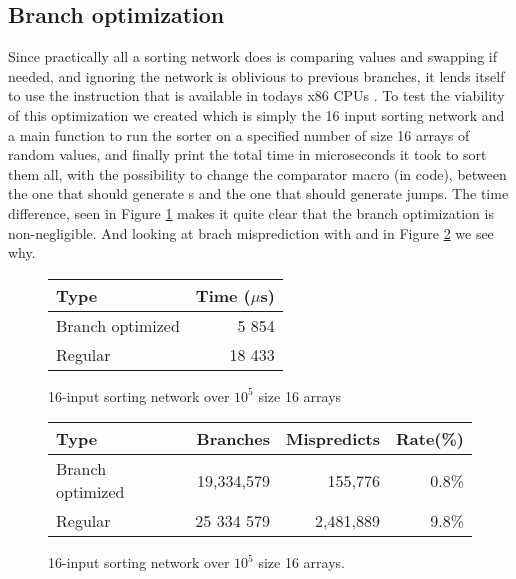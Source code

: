 \subsection{Branch optimization}
Since practically all a sorting network does is comparing values and swapping
if needed, and ignoring the network is oblivious to previous branches, it lends
itself to use the  instruction that is available in todays x86 CPUs
\cite{CCNS-2015}. To test the viability of this optimization we created
 which is simply the 16 input sorting network and a main function
to run the sorter on a specified number of size 16 arrays of random values, and
finally print the total time in microseconds it took to sort them all, with the
possibility to change the comparator macro (in code), between the one that
should generate s and the one that should generate jumps. The time
difference, seen in Figure \ref{fig:branch-time} makes it quite clear that the
branch optimization is non-negligible. And looking at brach misprediction with
 and  in Figure \ref{fig:branch-predict} we see
why.

\begin{figure}
    \centering
    \begin{tabular}{lr}
        Type             & Time ($\mu$s)\\\hline
        Branch optimized & 5 854\\
        Regular          & 18 433\\
    \end{tabular}
    \caption{16-input sorting network over $10^5$ size 16 arrays}
    \label{fig:branch-time}
\end{figure}

\begin{figure}
    \centering
    \begin{tabular}{lrrr}
        Type             & Branches & Mispredicts & Rate(\%) \\\hline
        Branch optimized & 19,334,579& 155,776    &  0.8\%\\
        Regular          & 25 334 579& 2,481,889  &  9.8\%\\
    \end{tabular}
    \caption{16-input sorting network over $10^5$ size 16 arrays.}
    \label{fig:branch-predict}
\end{figure}

